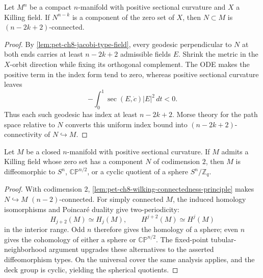 \begin{lemma}
  \label{lem:pet-ch8-wilking-connectedness-principle}
  Let $M^n$ be a compact $n$-manifold with positive sectional curvature and $X$
  a Killing field. If $N^{n-k}$ is a component of the zero set of $X$, then
  $N\subset M$ is $(n-2k+2)$-connected.
\end{lemma}
\begin{proof}
  \sketch
  By \cref{lem:pet-ch8-jacobi-type-field}, every geodesic perpendicular to
  \(N\) at both ends carries at least \(n-2k+2\) admissible fields \(E\).
  Shrink the metric in the \(X\)-orbit direction while fixing its orthogonal
  complement. The ODE makes the positive term in the index form tend to zero,
  whereas positive sectional curvature leaves
  \[
    -\int_0^1\sec(E,\dot c)|E|^2\,dt<0.
  \]
  Thus each such geodesic has index at least \(n-2k+2\). Morse theory for the
  path space relative to \(N\) converts this uniform index bound into
  \((n-2k+2)\)-connectivity of \(N\hookrightarrow M\).
\end{proof}

\begin{lemma}
  \label{lem:pet-ch8-grove-searle-codim2}
  Let $M$ be a closed $n$-manifold with positive sectional curvature. If $M$
  admits a Killing field whose zero set has a component $N$ of codimension
  $2$, then $M$ is diffeomorphic to $S^n$, $\mathbb{CP}^{n/2}$, or a cyclic
  quotient of a sphere $S^n/\mathbb{Z}_q$.
\end{lemma}
\begin{proof}
  \sketch
  With codimension \(2\),
  \cref{lem:pet-ch8-wilking-connectedness-principle} makes
  \(N\hookrightarrow M\) \((n-2)\)-connected. For simply connected \(M\), the
  induced homology isomorphisms and Poincar\'e duality give two-periodicity:
  \[
    H_{j+2}(M)\simeq H_j(M),\qquad
    H^{j+2}(M)\simeq H^j(M)
  \]
  in the interior range. Odd \(n\) therefore gives the homology of a sphere;
  even \(n\) gives the cohomology of either a sphere or
  \(\mathbb{CP}^{n/2}\). The fixed-point tubular-neighborhood argument upgrades
  these alternatives to the asserted diffeomorphism types. On the universal
  cover the same analysis applies, and the deck group is cyclic, yielding the
  spherical quotients.
\end{proof}

